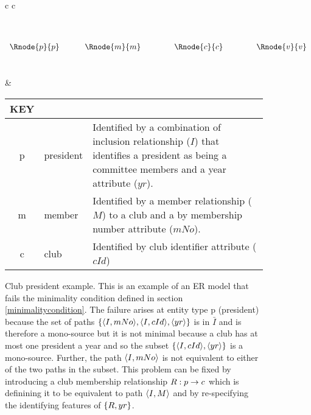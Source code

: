 \begin{figure} [h]
\begin{center}
\begin{tabular}{c c}
$
\begin{array}{cp{0.4cm}cp{0.75cm}cp{0.75cm}c}
              &&               &&                &&               \\[0.25cm]
              &&               &&                &&               \\[0.25cm]
\Rnode{p}{p}	&& \Rnode{m}{m}  &&   \Rnode{c}{c} && \Rnode{v}{v}  \\[0.25cm]
	            &&  
\end{array}
$

\idcomp
{}
\idcomp
{}
\idcomp
{}
\idcomp
{}
\idcomp
& \footnotesize
\begin{tabular}{c p{1.5cm} p{4cm}}
KEY && \\
\hline
p  & president        & Identified by a combination of inclusion relationship ($I$) that identifies a
                       president as being a committee members and a year attribute ($yr$). \\
m  & member           & Identified by a member relationship ($M$) to a club and a by membership 
                         number attribute ($mNo$). \\
c  & club             & Identified by club identifier attribute ($cId$)
\end{tabular} 
\end{tabular}
\end{center}
\caption{Club president example. 
This is an example of an ER model that fails the minimality condition defined in section \ref{minimalitycondition}.
The failure arises at entity type p (president) because 
the set of paths $\left\{\langle I,mNo\rangle, \langle I,cId\rangle, \langle yr\rangle\right\}$ is
in $\bar{I}$ and is therefore a mono-source but it is not minimal because
 a club has at most one president a year and so the subset $\left\{\langle I,cId\rangle, \langle yr\rangle\right\}$ is  a
mono-source. Further, the path $\langle I,mNo\rangle$ is not equivalent to either of the two paths in the subset.
This problem can be fixed by introducing a club membership relationship $R: p \rightarrow c$ which is definining it to be equivalent to
path $\langle I,M\rangle$ and by re-specifying the identifying features of $\left\{R,yr\right\}$.
}
\label{clubpresidentbeforenormalisation}
\end{figure}

